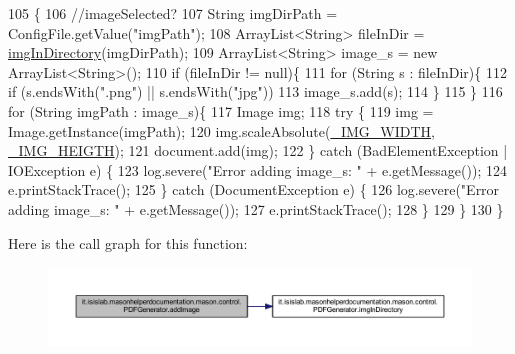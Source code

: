 \begin{DoxyCode}
105                                              \{
106         \textcolor{comment}{//imageSelected?}
107         String imgDirPath = ConfigFile.getValue(\textcolor{stringliteral}{"imgPath"});
108         ArrayList<String> fileInDir = \hyperlink{classit_1_1isislab_1_1masonhelperdocumentation_1_1mason_1_1control_1_1_p_d_f_generator_a9fa1dfe581da4d09e9c7bee1a8b12972}{imgInDirectory}(imgDirPath);
109         ArrayList<String> image\_s = \textcolor{keyword}{new} ArrayList<String>();
110         \textcolor{keywordflow}{if} (fileInDir != null)\{
111             \textcolor{keywordflow}{for} (String s : fileInDir)\{
112                 \textcolor{keywordflow}{if} (s.endsWith(\textcolor{stringliteral}{".png"}) || s.endsWith(\textcolor{stringliteral}{"jpg"}))
113                     image\_s.add(s);
114             \}
115         \}
116         \textcolor{keywordflow}{for} (String imgPath : image\_s)\{
117             Image img;
118             \textcolor{keywordflow}{try} \{
119                 img = Image.getInstance(imgPath);
120                 img.scaleAbsolute(\hyperlink{classit_1_1isislab_1_1masonhelperdocumentation_1_1mason_1_1control_1_1_p_d_f_generator_adf2d9b75632647f25441597140cb36f7}{\_IMG\_WIDTH}, \hyperlink{classit_1_1isislab_1_1masonhelperdocumentation_1_1mason_1_1control_1_1_p_d_f_generator_a7d5a4882865b3339cca7e6b532a4620a}{\_IMG\_HEIGTH});
121                 document.add(img);
122             \} \textcolor{keywordflow}{catch} (BadElementException | IOException e) \{
123                 log.severe(\textcolor{stringliteral}{"Error adding image\_s: "} + e.getMessage());
124                 e.printStackTrace();
125             \} \textcolor{keywordflow}{catch} (DocumentException e) \{
126                 log.severe(\textcolor{stringliteral}{"Error adding image\_s: "} + e.getMessage());
127                 e.printStackTrace();
128             \}
129         \}
130     \}
\end{DoxyCode}


Here is the call graph for this function\-:
\nopagebreak
\begin{figure}[H]
\begin{center}
\leavevmode
\includegraphics[width=350pt]{classit_1_1isislab_1_1masonhelperdocumentation_1_1mason_1_1control_1_1_p_d_f_generator_abc1f7c0af1e9a3328d917e6e1751d421_cgraph}
\end{center}
\end{figure}




